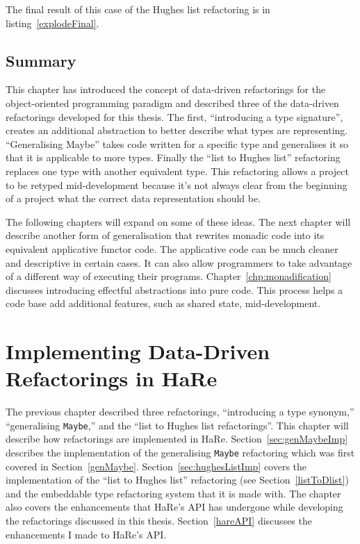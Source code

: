 The final result of this case of the Hughes list refactoring is in listing~\ref{explodeFinal}.

\section{Summary}

This chapter has introduced the concept of data-driven refactorings for the object-oriented programming paradigm and described three of the data-driven refactorings developed for this thesis. The first, ``introducing a type signature'', creates an additional abstraction to better describe what types are representing. ``Generalising Maybe'' takes code written for a specific type and generalises it so that it is applicable to more types. Finally the ``list to Hughes list'' refactoring replaces one type with another equivalent type. This refactoring allows a project to be retyped mid-development because it's not always clear from the beginning of a project what the correct data representation should be.

The following chapters will expand on some of these ideas. The next chapter will describe another form of generalisation that rewrites monadic code into its equivalent applicative functor code. The applicative code can be much cleaner and descriptive in certain cases. It can also allow programmers to take advantage of a different way of executing their programs. Chapter~\ref{chp:monadification} discusses introducing effectful abstractions into pure code. This process helps a code base add additional features, such as shared state, mid-development.

\chapter{Implementing Data-Driven Refactorings in HaRe}
\label{chp:generalImp}

\renewcommand{\topfraction}{1}
\renewcommand{\floatpagefraction}{1}

The previous chapter described three refactorings, ``introducing a type synonym,'' ``generalising \texttt{Maybe},'' and the ``list to Hughes list refactorings''. This chapter will describe how refactorings are implemented in HaRe. Section~\ref{sec:genMaybeImp} describes the implementation of the generalising \texttt{Maybe} refactoring which was first covered in Section~\ref{genMaybe}. Section~\ref{sec:hughesListImp} covers the implementation of the ``list to Hughes list'' refactoring (see Section~\ref{listToDlist}) and the embeddable type refactoring system that it is made with. The chapter also covers the enhancements that HaRe's API has undergone while developing the refactorings discussed in this thesis. Section~\ref{hareAPI} discusses the enhancements I made to HaRe's API.

